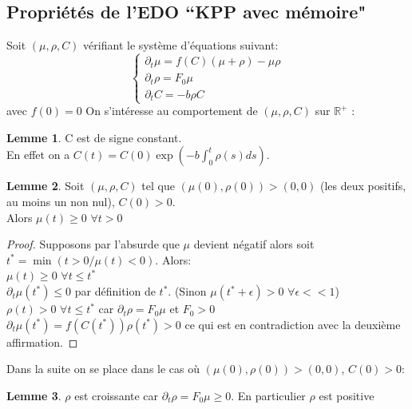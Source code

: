\documentclass[11pt]{article}
\newcommand{\dt}{\partial_t}
\theoremstyle{definition}
\begin{document}
\fi



\subsection{Propriétés de l'EDO ``KPP avec mémoire"}
\newtheorem{lemma}{Lemme}
Soit $(\mu,\rho,C)$ vérifiant le système d’équations suivant:
\begin{equation} \left\{
                \begin{array}{ll}
                   \dt\mu  = f(C)(\mu + \rho) -\mu\rho\\
                 \dt\rho=  F_0 \mu \\
                  \dt C = -b\rho C
                \end{array}
              \right.
\end{equation} avec $f(0)=0$
On s’intéresse au comportement de $(\mu,\rho,C)$ sur $\mathbb{R}^+$ : 
\begin{lemma}C est de signe constant.\\
En effet on a $C(t)= C(0)\exp(-b\int_{0}^{t}\rho(s)ds)$.
\end{lemma}

\begin{lemma}Soit $(\mu,\rho,C)$ tel que $(\mu(0),\rho(0))> (0,0)$ (les deux positifs, au moins un non nul), $C(0)>0$.\\  Alors $\mu(t)\geq 0$ $\forall t>0$
\end{lemma}
\begin{proof}
Supposons par l'absurde que $\mu$ devient négatif alors soit $t^*= \min(t>0/ \mu(t)<0)$. Alors: \\
$\mu(t)\geq 0$ $\forall t \leq t^*$\\
$\dt\mu(t^*) \leq 0$ par définition de $t^*$. (Sinon $\mu(t^*+\epsilon)>0$ $\forall \epsilon <<1$)\\
$\rho(t)>0$ $\forall t\leq t^*$ car $\dt\rho=  F_0 \mu$ et $F_0>0$\\
$\dt\mu(t^*) = f(C(t^*))\rho(t^*) > 0$ ce qui est en contradiction avec la deuxième affirmation.
\end{proof}
Dans la suite on se place dans le cas où $(\mu(0),\rho(0))> (0,0)$, $C(0)>0$:
\begin{lemma} $\rho$ est croissante car $\dt\rho=  F_0 \mu \geq 0$. En particulier $\rho$ est positive \end{lemma}
\end{document}
